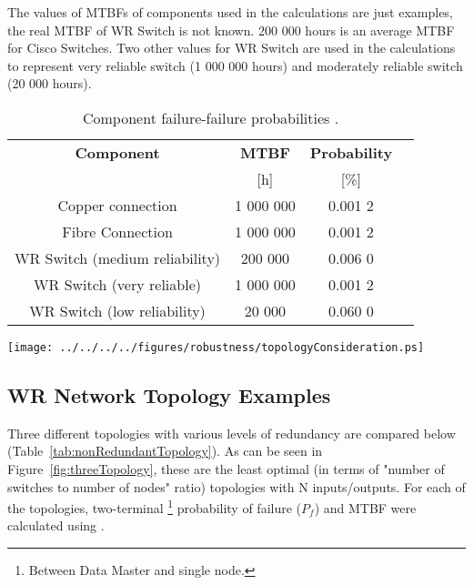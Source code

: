 The values of MTBFs of components used in the calculations are just examples,
the real MTBF of WR Switch is not known. 200 000 hours is an average MTBF for
Cisco Switches. Two other values for WR Switch are used in the calculations to
represent very reliable switch (1 000 000 hours) and moderately reliable switch
(20 000 hours). 
\begin{table}[ht]
\caption{Component failure-failure probabilities \cite{The All-New Switch Book:
The Complete Guide to LAN Switching Technology}. }
\centering
\begin{tabular}{|c|c|c|c|}          \hline
\textbf{Component}& \textbf{MTBF} & \textbf{Probability} \\
                  &    [h]       &        [\%]   \\ \hline
Copper connection &   1 000 000   &   0.001 2  \\ \hline
Fibre Connection  &   1 000 000   &   0.001 2  \\ \hline
WR Switch (medium reliability)&     200 000   &   0.006 0  \\ \hline
WR Switch (very reliable)     &   1 000 000   &   0.001 2  \\ \hline
WR Switch (low reliability)   &      20 000   &   0.060 0 \\ \hline

\end{tabular}
\label{tab:MTBFandProbabilityOfComponents}
\end{table}


\begin{center}
	\texttt{[image: ../../../../figures/robustness/topologyConsideration.ps]}
	\label{fig:topologyConsideration}
\end{center}

\subsection{WR Network Topology Examples}
\label{WRnetworkTopologyExamples}
Three different topologies with various levels of redundancy are compared
below (Table~\ref{tab:nonRedundantTopology}). As can be seen in
Figure~\ref{fig:threeTopology}, these are the least
optimal (in terms of "number of switches to number of nodes" ratio) topologies
with N inputs/outputs. For each of the topologies, two-terminal
\footnote{Between Data Master and single node.} probability of failure ($P_f$)
and MTBF were calculated using \cite{FaultTree}. 


